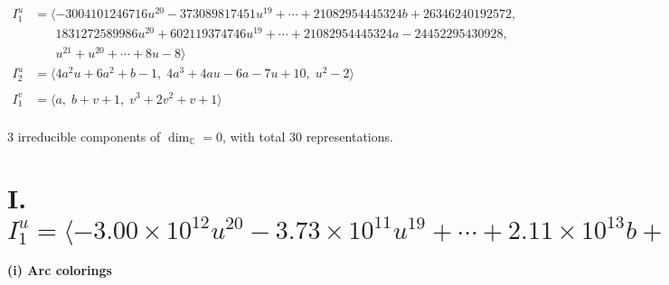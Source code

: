 \documentclass[1p]{elsarticle_modified}
\theoremstyle{definition}
\begin{document}
\begin{align*}
I^u_{1}&=\langle 
-3004101246716 u^{20}-373089817451 u^{19}+\cdots+21082954445324 b+26346240192572,\\
\phantom{I^u_{1}}&\phantom{= \langle  }1831272589986 u^{20}+602119374746 u^{19}+\cdots+21082954445324 a-24452295430928,\\
\phantom{I^u_{1}}&\phantom{= \langle  }u^{21}+u^{20}+\cdots+8 u-8\rangle \\
I^u_{2}&=\langle 
4 a^2 u+6 a^2+b-1,\;4 a^3+4 a u-6 a-7 u+10,\;u^2-2\rangle \\
\\
I^v_{1}&=\langle 
a,\;b+v+1,\;v^3+2 v^2+v+1\rangle \\
\end{align*}
\raggedright * 3 irreducible components of $\dim_{\mathbb{C}}=0$, with total 30 representations.\\
\newpage
\renewcommand{\arraystretch}{1}
\centering \section*{I. $I^u_{1}= \langle -3.00\times10^{12} u^{20}-3.73\times10^{11} u^{19}+\cdots+2.11\times10^{13} b+2.63\times10^{13},\;1.83\times10^{12} u^{20}+6.02\times10^{11} u^{19}+\cdots+2.11\times10^{13} a-2.45\times10^{13},\;u^{21}+u^{20}+\cdots+8 u-8 \rangle$}
\flushleft \textbf{(i) Arc colorings}\\
\end{document}
